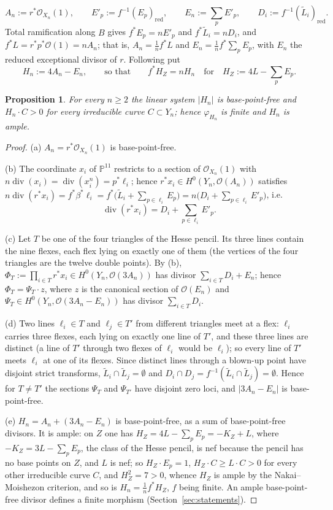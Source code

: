 \documentclass[11pt]{amsart}
\newtheorem{proposition}[theorem]{Proposition}
\theoremstyle{remark}
\theoremstyle{definition}
\newcommand{\PP}{\mathbb{P}}
\newcommand{\cO}{\mathcal{O}}
\begin{document}
\[
A_n:=r^*\cO_{X_n}(1),\qquad E'_p:=f^{-1}(E_p)_{\mathrm{red}},\qquad E_n:=\sum_pE'_p,\qquad D_i:=f^{-1}(\tilde L_i)_{\mathrm{red}} .
\]
Total ramification along $B$ gives $f^*E_p=nE'_p$ and $f^*\tilde L_i=nD_i$, and $f^*L=r^*p^*\cO(1)=nA_n$; that is, $A_n=\tfrac1nf^*L$ and $E_n=\tfrac1nf^*\sum_pE_p$, with $E_n$ the reduced exceptional divisor of $r$. Following \cite[Thm.~1.2]{An} put
\[
H_n:=4A_n-E_n,\qquad\text{so that}\qquad f^*H_Z=nH_n\quad\text{for}\quad H_Z:=4L-\textstyle\sum_pE_p .
\]

\begin{proposition}\label{prop:bpf}
For every $n\ge2$ the linear system $|H_n|$ is base-point-free and $H_n\cdot C>0$ for every irreducible curve $C\subset Y_n$; hence $\varphi_{H_n}$ is finite and $H_n$ is ample.
\end{proposition}

\begin{proof}
(a) $A_n=r^*\cO_{X_n}(1)$ is base-point-free.

(b) The coordinate $x_i$ of $\PP^{11}$ restricts to a section of $\cO_{X_n}(1)$ with $n\operatorname{div}(x_i)=\operatorname{div}(x_i^n)=p^*\ell_i$; hence $r^*x_i\in H^0(Y_n,\cO(A_n))$ satisfies $n\operatorname{div}(r^*x_i)=f^*\beta^*\ell_i=f^*\bigl(\tilde L_i+\sum_{p\in\ell_i}E_p\bigr)=n\bigl(D_i+\sum_{p\in\ell_i}E'_p\bigr)$, i.e.
\[
\operatorname{div}(r^*x_i)=D_i+\sum_{p\in\ell_i}E'_p .
\]

(c) Let $T$ be one of the four triangles of the Hesse pencil. Its three lines contain the nine flexes, each flex lying on exactly one of them (the vertices of the four triangles are the twelve double points). By (b), $\Phi_T:=\prod_{i\in T}r^*x_i\in H^0(Y_n,\cO(3A_n))$ has divisor $\sum_{i\in T}D_i+E_n$; hence $\Phi_T=\Psi_T\cdot z$, where $z$ is the canonical section of $\cO(E_n)$ and $\Psi_T\in H^0(Y_n,\cO(3A_n-E_n))$ has divisor $\sum_{i\in T}D_i$.

(d) Two lines $\ell_i\in T$ and $\ell_j\in T'$ from different triangles meet at a flex: $\ell_i$ carries three flexes, each lying on exactly one line of $T'$, and these three lines are distinct (a line of $T'$ through two flexes of $\ell_i$ would be $\ell_i$); so every line of $T'$ meets $\ell_i$ at one of its flexes. Since distinct lines through a blown-up point have disjoint strict transforms, $\tilde L_i\cap\tilde L_j=\emptyset$ and $D_i\cap D_j=f^{-1}(\tilde L_i\cap\tilde L_j)=\emptyset$. Hence for $T\ne T'$ the sections $\Psi_T$ and $\Psi_{T'}$ have disjoint zero loci, and $|3A_n-E_n|$ is base-point-free.

(e) $H_n=A_n+(3A_n-E_n)$ is base-point-free, as a sum of base-point-free divisors. It is ample: on $Z$ one has $H_Z=4L-\sum_pE_p=-K_Z+L$, where $-K_Z=3L-\sum_pE_p$, the class of the Hesse pencil, is nef because the pencil has no base points on $Z$, and $L$ is nef; so $H_Z\cdot E_p=1$, $H_Z\cdot C\ge L\cdot C>0$ for every other irreducible curve $C$, and $H_Z^2=7>0$, whence $H_Z$ is ample by the Nakai--Moishezon criterion, and so is $H_n=\tfrac1nf^*H_Z$, $f$ being finite. An ample base-point-free divisor defines a finite morphism (Section~\ref{sec:statements}).
\end{proof}
\end{document}
